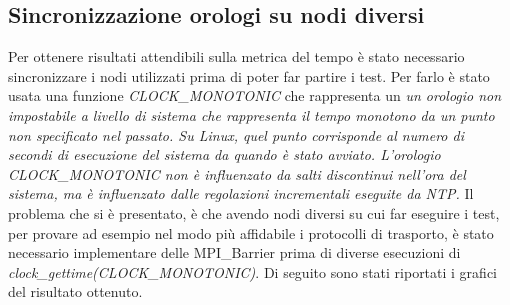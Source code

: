 \subsection{Sincronizzazione orologi su nodi diversi}
Per ottenere risultati attendibili sulla metrica del tempo è stato necessario sincronizzare i nodi utilizzati prima di poter far partire i test. Per farlo è stato usata una funzione \emph{CLOCK\_MONOTONIC} che rappresenta un \textit{un orologio non impostabile a livello di sistema che rappresenta il tempo monotono da un punto non specificato nel passato. Su Linux, quel punto corrisponde al numero di secondi di esecuzione del sistema da quando è stato avviato. L'orologio CLOCK\_MONOTONIC non è influenzato da salti discontinui nell'ora del sistema, ma è influenzato dalle regolazioni incrementali eseguite da  NTP.} Il problema che si è presentato, è che avendo nodi diversi su cui far eseguire i test, per provare ad esempio nel modo più affidabile i protocolli di trasporto, è stato necessario implementare delle MPI\_Barrier prima di diverse esecuzioni di \emph{clock\_gettime(CLOCK\_MONOTONIC)}. Di seguito sono stati riportati i grafici del risultato ottenuto.
